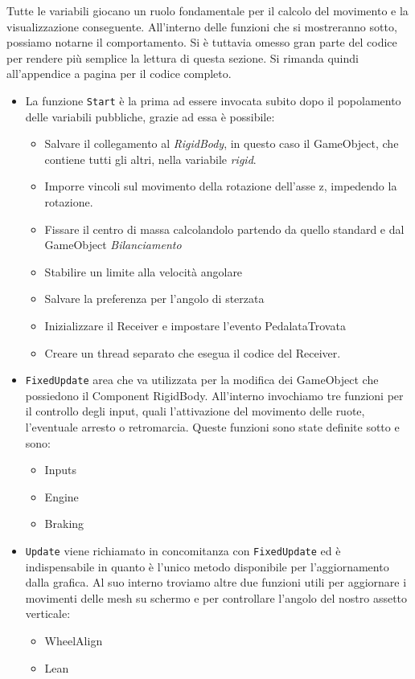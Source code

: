 \noindent Tutte le variabili giocano un ruolo fondamentale per il calcolo del movimento e la visualizzazione conseguente. All’interno delle funzioni che si mostreranno sotto, possiamo notarne il comportamento. Si è tuttavia omesso gran parte del codice per rendere più semplice la lettura di questa sezione. Si rimanda quindi all'appendice  a pagina \pageref{controller} per il codice completo.
\begin{itemize}
	
	\item La funzione \texttt{Start} è la prima ad essere invocata subito dopo il popolamento delle variabili pubbliche, grazie ad essa è possibile:
  	\begin{itemize}
  		\item Salvare il collegamento al \textit{RigidBody}, in questo caso il GameObject, che contiene tutti gli altri, nella variabile \textit{rigid}.
  		\item Imporre vincoli sul movimento della rotazione dell’asse z, impedendo la rotazione.
  		\item Fissare il centro di massa calcolandolo partendo da quello standard e dal GameObject \textit{Bilanciamento}
  		\item Stabilire un limite alla velocità angolare
  		\item Salvare la preferenza per l’angolo di sterzata
  		\item Inizializzare il Receiver e impostare l'evento PedalataTrovata
  		\item Creare un thread separato che esegua il codice del Receiver.
	\end{itemize}
	
	\item \texttt{FixedUpdate} area che va utilizzata per la modifica dei GameObject che possiedono il Component RigidBody. All’interno invochiamo tre funzioni per il controllo degli input, quali l’attivazione del movimento delle ruote, l’eventuale arresto o retromarcia. Queste funzioni sono state definite sotto e sono:
		\begin{itemize}
			\item Inputs
			\item Engine
			\item Braking
		\end{itemize}
		
	\item \texttt{Update} viene richiamato in concomitanza con \texttt{Fixed\-Update} ed è indispensabile in quanto è l’unico metodo disponibile per l’aggiornamento dalla grafica. Al suo interno troviamo altre due funzioni utili per aggiornare i movimenti delle mesh su schermo e per controllare l’angolo del nostro assetto verticale:		\begin{itemize}
			\item WheelAlign
			\item Lean
		\end{itemize}
	

\end{itemize}
